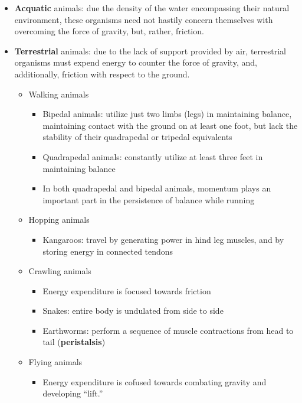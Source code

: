 \documentclass{article}
\begin{document}
\begin{itemize}
    \item \textbf{Acquatic} animals: due the density of the water encompassing their
    natural environment, these organisms need not hastily concern themselves with
    overcoming the force of gravity, but, rather, friction.
    \item \textbf{Terrestrial} animals: due to the lack of support provided by air,
    terrestrial organisms must expend energy to counter the force of gravity,
    and, additionally, friction with respect to the ground.
    \begin{itemize}
        \item Walking animals
            \begin{itemize}
                \item Bipedal animals: utilize just two limbs (legs) in
                maintaining balance, maintaining contact with the ground on at
                least one foot, but lack the stability of their quadrapedal or
                tripedal equivalents
                \item Quadrapedal animals: constantly utilize at least three feet
                in maintaining balance
                \item In both quadrapedal and bipedal animals, momentum plays
                an important part in the persistence of balance while running
            \end{itemize}
        \item Hopping animals
            \begin{itemize}
              \item Kangaroos: travel by generating power in hind leg muscles,
                and by storing energy in connected tendons
            \end{itemize}
        \item Crawling animals
            \begin{itemize}
                \item Energy expenditure is focused towards friction
                \item Snakes: entire body is undulated from side to side
                \item Earthworms: perform a sequence of muscle contractions from
                head to tail (\textbf{peristalsis})
            \end{itemize}
        \item Flying animals
            \begin{itemize}
                \item Energy expenditure is cofused towards combating gravity
                and developing ``lift.''
            \end{itemize}
    \end{itemize}
\end{itemize}
\end{document}
